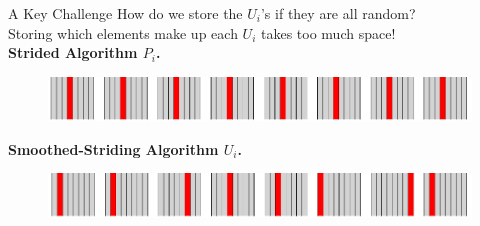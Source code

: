 \documentclass[xcolor=x11names, svgnames, rgb]{beamer}
\begin{document}

\begin{frame}[t]{A Key Challenge}
How do we store the $U_i$'s if they are all random?	\\
\vspace{0.5cm}
Storing which elements make up each $U_i$ takes too much space!\\

\vspace{0.5cm}
\textbf{Strided Algorithm $P_i$.}
\begin{figure}
	\includegraphics[width=\linewidth]{imgs/stridedAlgHighlighted.png}
\end{figure}
\textbf{Smoothed-Striding Algorithm $U_i$.}
\begin{figure}
	\includegraphics[width=\linewidth]{imgs/smoothedStridingAlgHighlighted.png}
\end{figure}
\end{frame}
\end{document}
